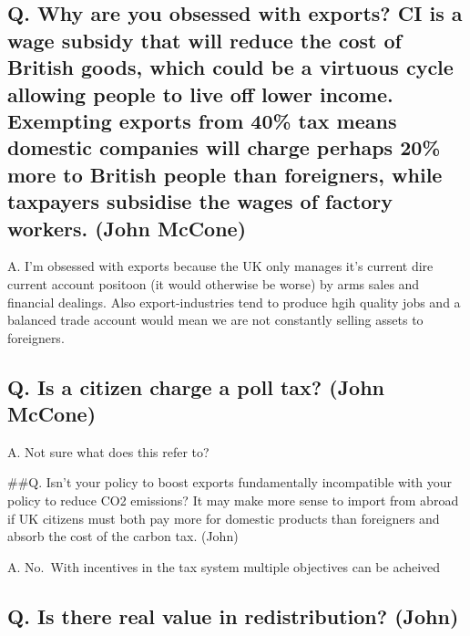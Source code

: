 \documentclass[]{tufte-handout}
\begin{document}
\hypertarget{q.-why-are-you-obsessed-with-exports-ci-is-a-wage-subsidy-that-will-reduce-the-cost-of-british-goods-which-could-be-a-virtuous-cycle-allowing-people-to-live-off-lower-income.-exempting-exports-from-40-tax-means-domestic-companies-will-charge-perhaps-20-more-to-british-people-than-foreigners-while-taxpayers-subsidise-the-wages-of-factory-workers.-john-mccone}{%
\subsection{Q. Why are you obsessed with exports? CI is a wage subsidy
that will reduce the cost of British goods, which could be a virtuous
cycle allowing people to live off lower income. Exempting exports from
40\% tax means domestic companies will charge perhaps 20\% more to
British people than foreigners, while taxpayers subsidise the wages of
factory workers. (John
McCone)}\label{q.-why-are-you-obsessed-with-exports-ci-is-a-wage-subsidy-that-will-reduce-the-cost-of-british-goods-which-could-be-a-virtuous-cycle-allowing-people-to-live-off-lower-income.-exempting-exports-from-40-tax-means-domestic-companies-will-charge-perhaps-20-more-to-british-people-than-foreigners-while-taxpayers-subsidise-the-wages-of-factory-workers.-john-mccone}}

A. I'm obsessed with exports because the UK only manages it's current
dire current account positoon (it would otherwise be worse) by arms
sales and financial dealings. Also export-industries tend to produce
hgih quality jobs and a balanced trade account would mean we are not
constantly selling assets to foreigners.

\hypertarget{q.-is-a-citizen-charge-a-poll-tax-john-mccone}{%
\subsection{Q. Is a citizen charge a poll tax? (John
McCone)}\label{q.-is-a-citizen-charge-a-poll-tax-john-mccone}}

A. Not sure what does this refer to?

\#\#Q. Isn't your policy to boost exports fundamentally incompatible
with your policy to reduce CO2 emissions? It may make more sense to
import from abroad if UK citizens must both pay more for domestic
products than foreigners and absorb the cost of the carbon tax. (John)

A. No.~With incentives in the tax system multiple objectives can be
acheived

\hypertarget{q.-is-there-real-value-in-redistribution-john}{%
\subsection{Q. Is there real value in redistribution?
(John)}\label{q.-is-there-real-value-in-redistribution-john}}
\end{document}
